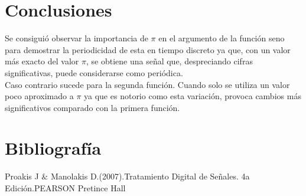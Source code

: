 \documentclass[12pt]{article}
\begin{document}
\section{Conclusiones}
Se consiguió observar la importancia de $\pi$ en el argumento de la función seno para demostrar la periodicidad de esta en tiempo discreto ya que, con un valor más exacto del valor $\pi$, se obtiene una señal que, despreciando cifras significativas, puede considerarse como periódica. 
\\
Caso contrario sucede para la segunda función. Cuando solo se utiliza un valor poco aproximado a $\pi$ ya que es notorio como esta variación, provoca cambios más significativos comparado con la primera función.

\section{Bibliografía}
\begin{thebibliography}{0}
  Proakis J $\&$ Manolakis D.(2007).Tratamiento Digital de Señales. 4a Edición.PEARSON Pretince Hall 
\end{thebibliography}
\end{document}
